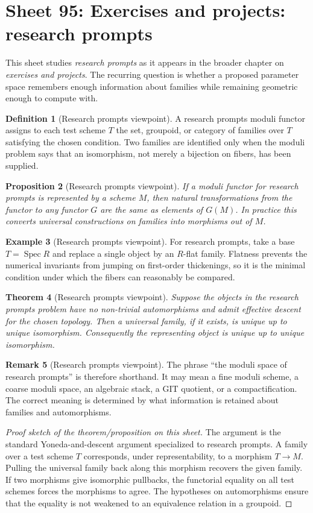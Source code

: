 \documentclass[11pt]{amsart}
\newtheorem{theorem}{Theorem}[section]
\newtheorem{proposition}[theorem]{Proposition}
\theoremstyle{definition}
\newtheorem{definition}[theorem]{Definition}
\newtheorem{example}[theorem]{Example}
\newtheorem{remark}[theorem]{Remark}
\newcommand{\Spec}{\operatorname{Spec}}
\begin{document}
\section{Sheet 95: Exercises and projects: research prompts}
This sheet studies \emph{research prompts} as it appears in the broader chapter on \emph{exercises and projects}.  The recurring question is whether a proposed parameter space remembers enough information about families while remaining geometric enough to compute with.
\begin{definition}[Research prompts viewpoint]
A research prompts moduli functor assigns to each test scheme $T$ the set, groupoid, or category of families over $T$ satisfying the chosen condition.  Two families are identified only when the moduli problem says that an isomorphism, not merely a bijection on fibers, has been supplied.
\end{definition}
\begin{proposition}[Research prompts viewpoint]
If a moduli functor for research prompts is represented by a scheme $M$, then natural transformations from the functor to any functor $G$ are the same as elements of $G(M)$.  In practice this converts universal constructions on families into morphisms out of $M$.
\end{proposition}
\begin{example}[Research prompts viewpoint]
For research prompts, take a base $T=\Spec R$ and replace a single object by an $R$-flat family.  Flatness prevents the numerical invariants from jumping on first-order thickenings, so it is the minimal condition under which the fibers can reasonably be compared.
\end{example}
\begin{theorem}[Research prompts viewpoint]
Suppose the objects in the research prompts problem have no non-trivial automorphisms and admit effective descent for the chosen topology.  Then a universal family, if it exists, is unique up to unique isomorphism.  Consequently the representing object is unique up to unique isomorphism.
\end{theorem}
\begin{remark}[Research prompts viewpoint]
The phrase ``the moduli space of research prompts'' is therefore shorthand.  It may mean a fine moduli scheme, a coarse moduli space, an algebraic stack, a GIT quotient, or a compactification.  The correct meaning is determined by what information is retained about families and automorphisms.
\end{remark}
\begin{proof}[Proof sketch of the theorem/proposition on this sheet]
The argument is the standard Yoneda-and-descent argument specialized to research prompts.  A family over a test scheme $T$ corresponds, under representability, to a morphism $T\to M$.  Pulling the universal family back along this morphism recovers the given family.  If two morphisms give isomorphic pullbacks, the functorial equality on all test schemes forces the morphisms to agree.  The hypotheses on automorphisms ensure that the equality is not weakened to an equivalence relation in a groupoid.
\end{proof}
\end{document}
